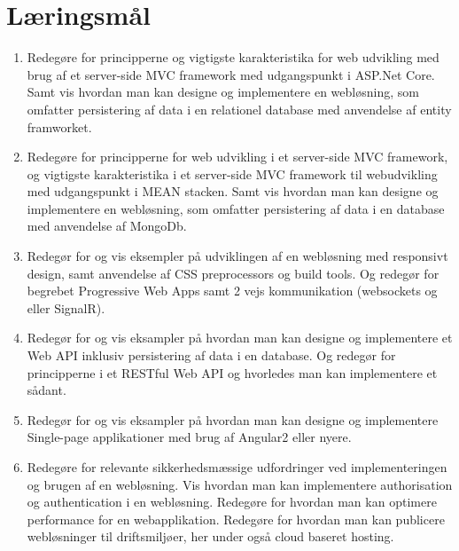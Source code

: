 \section*{Læringsmål}

\begin{enumerate}
	
	\item 
	Redegøre for principperne og vigtigste karakteristika for web	udvikling med brug af et server-side MVC framework med udgangspunkt i ASP.Net Core. Samt vis hvordan man kan designe og implementere en	webløsning, som omfatter persistering af data i en relationel database med anvendelse af entity framworket.
	
	\item 
	Redegøre for principperne for web udvikling i et server-side MVC framework, og vigtigste karakteristika i et server-side	MVC framework til webudvikling med udgangspunkt i MEAN stacken.	Samt vis hvordan man kan designe og implementere en	webløsning, som omfatter persistering af data i en database	med anvendelse af MongoDb.
	
	\item 
	Redegør for og vis eksempler på udviklingen af en webløsning med responsivt design, samt anvendelse af CSS preprocessors og build tools. Og redegør for begrebet Progressive Web Apps samt 2 vejs	kommunikation (websockets og eller SignalR).
	
	\item 
	Redegør for og vis eksampler på hvordan man kan designe	og implementere et Web API inklusiv persistering af data i en database.	Og redegør for principperne i et RESTful Web API og	hvorledes man kan implementere et sådant.
		
	\item 
	Redegør for og vis eksampler på hvordan man kan designe	og implementere Single-page applikationer med brug af	Angular2 eller nyere.
	
	\item 
	Redegøre for relevante sikkerhedsmæssige udfordringer ved implementeringen og brugen af en webløsning.	Vis hvordan man kan implementere authorisation og authentication i en webløsning.	Redegøre for hvordan man kan optimere performance for en webapplikation. Redegøre for hvordan man kan publicere webløsninger til driftsmiljøer, her under også cloud baseret hosting.
	
\end{enumerate}